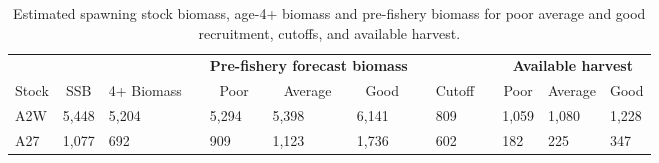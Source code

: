 %
\begin{table}[!tbp]
 \small
 \caption{Estimated spawning stock biomass,  age-4+ biomass and pre-fishery
			biomass for poor average and good recruitment,  cutoffs,  and 
			available harvest.\label{TableCatchAdvice}} 
 \begin{center}
 \begin{tabular}{lllclllclclll}\hline\hline
\multicolumn{3}{c}{\bfseries }&
\multicolumn{1}{c}{\bfseries }&
\multicolumn{3}{c}{\bfseries Pre-fishery forecast biomass}&
\multicolumn{1}{c}{\bfseries }&
\multicolumn{1}{c}{\bfseries }&
\multicolumn{1}{c}{\bfseries }&
\multicolumn{3}{c}{\bfseries Available harvest}
\tabularnewline \cline{1-13}
\multicolumn{1}{c}{Stock}&\multicolumn{1}{c}{SSB}&\multicolumn{1}{c}{4+ Biomass}&\multicolumn{1}{c}{}&\multicolumn{1}{c}{Poor}&\multicolumn{1}{c}{Average}&\multicolumn{1}{c}{Good}&\multicolumn{1}{c}{}&\multicolumn{1}{c}{Cutoff}&\multicolumn{1}{c}{}&\multicolumn{1}{c}{Poor}&\multicolumn{1}{c}{Average}&\multicolumn{1}{c}{Good}\tabularnewline
\hline
A2W&5,448&5,204&&5,294&5,398&6,141&&  809&&1,059&1,080&1,228\tabularnewline
A27&1,077&  692&&  909&1,123&1,736&&  602&&  182&  225&  347\tabularnewline
\hline
\end{tabular}

\end{center}

\end{table}

